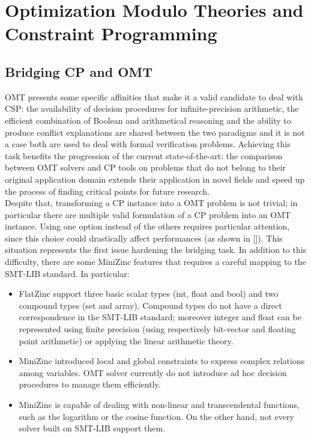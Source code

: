 \chapter{Optimization Modulo Theories and Constraint Programming}
\label{cha:introOMT}

\section{Bridging CP and OMT}

OMT presents some specific affinities that make it a valid candidate to deal with CSP: the availability of decision procedures for infinite-precision arithmetic, the efficient combination of
Boolean and arithmetical reasoning and the ability to produce conflict explanations are shared between the two paradigms and it is not a case both are used to deal with formal verification problems. Achieving this task benefits the progression of the current state-of-the-art: the comparison between OMT solvers and CP tools on problems that do not belong to their original application domain extends their application in novel fields and speed up the process of finding critical points for future research. \\ 
Despite that, transforming a CP instance into a OMT problem is not trivial; in particular there are multiple valid formulation of a CP problem into an OMT instance. Using one option instead of the others requires particular attention, since this choice could drastically affect performances (as shown in []). This situation represents the first issue hardening the bridging task. In addition to this difficulty, there are some MiniZinc features that requires a careful mapping to the SMT-LIB standard. In particular:

\begin{itemize}
    \item FlatZinc support three basic scalar types (int, float and bool) and two compound types (set and array). Compound types do not have a direct correspondence in the SMT-LIB standard; moreover integer and float can be represented using finite precision (using respectively bit-vector and floating point arithmetic) or applying the linear arithmetic theory.
    \item MiniZinc introduced local and global constraints to express complex relations among variables. OMT solver currently do not introduce ad hoc decision procedures to manage them efficiently.
    \item MiniZinc is capable of dealing with non-linear and transcendental functions, such as the logarithm or the cosine function. On the other hand, not every solver built on SMT-LIB support them.
\end{itemize}

\pagebreak
